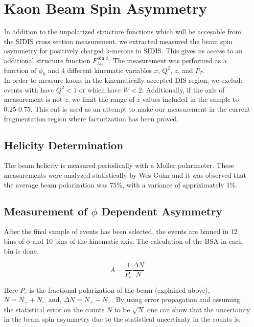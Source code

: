 \section{Kaon Beam Spin Asymmetry}

In addition to the unpolarized structure functions which will be accesable from the SIDIS cross section measurement, we extracted measured the beam spin asymmetry for positively charged k-mesons in SIDIS.  This gives us access to an additional structure function $F_{LU}^{\sin\phi}$.  The measurement was performed as a function of $\phi_h$ and 4 different kinematic variables $x$, $Q^2$, $z$, and $P_T$.  \\

In order to measure kaons in the kinematically accepted DIS region, we exclude events with have $Q^2 < 1$ or which have $W < 2$.  Additionally, if the axis of measurement is not $z$, we limit the range of $z$ values included in the sample to 0.25-0.75.  This cut is used as an attempt to make our measurement in the current fragmentation region where factorization has been proved.  

\subsection{Helicity Determination}
The beam helicity is measured periodically with a Moller polarimeter.  These measurements were analyzed statistically by Wes Gohn and it was observed that the average beam polarization was 75\%, with a variance of appriximately 1\%.  

\subsection{Measurement of $\phi$ Dependent Asymmetry}
After the final sample of events has been selected, the events are binned in 12 bins of $\phi$ and 10 bins of the kinematic axis.  The calculation of the BSA in each bin is done.

\begin{equation}
  A = \frac{1}{P_e} \frac{\Delta N}{N}
\end{equation}

Here $P_e$ is the fractional polarization of the beam (explained above), $N = N_+ + N_-$ and, $\Delta N = N_+ - N_-$.  By using error propagation and assuming the statistical error on the counts $N$ to be $\sqrt{N}$ one can show that the uncertainty in the beam spin asymmetry due to the statistical uncertianty in the counts is,

